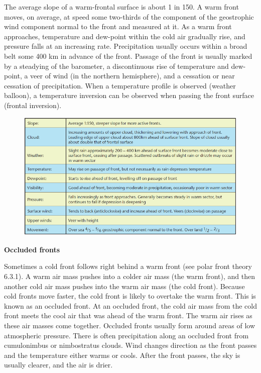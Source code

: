 \documentclass[12pt,oneside]{book}
\begin{document}
The average slope of a warm-frontal surface is about 1 in 150. A warm
front moves, on average, at speed some two-thirds of the component of
the geostrophic wind component normal to the front and measured at it.
As a warm front approaches, temperature and dew-point within the cold
air gradually rise, and pressure falls at an increasing rate.
Precipitation usually occurs within a broad belt some 400 km in advance
of the front. Passage of the front is usually marked by a steadying of
the barometer, a discontinuous rise of temperature and dew-point, a veer
of wind (in the northern hemisphere), and a cessation or near cessation
of precipitation. When a temperature profile is observed (weather
balloon), a temperature inversion can be observed when passing the front
surface (frontal inversion).

\begin{figure}

{\centering \includegraphics[width=0.8\linewidth]{figures/Figure624c} 

}

\caption{ }\label{fig:Fig624c}
\end{figure}

\textbf{Occluded fronts}

Sometimes a cold front follows right behind a warm front (see polar
front theory 6.3.1). A warm air mass pushes into a colder air mass (the
warm front), and then another cold air mass pushes into the warm air
mass (the cold front). Because cold fronts move faster, the cold front
is likely to overtake the warm front. This is known as an occluded
front. At an occluded front, the cold air mass from the cold front meets
the cool air that was ahead of the warm front. The warm air rises as
these air masses come together. Occluded fronts usually form around
areas of low atmospheric pressure. There is often precipitation along an
occluded front from cumulonimbus or nimbostratus clouds. Wind changes
direction as the front passes and the temperature either warms or cools.
After the front passes, the sky is usually clearer, and the air is
drier.
\end{document}
